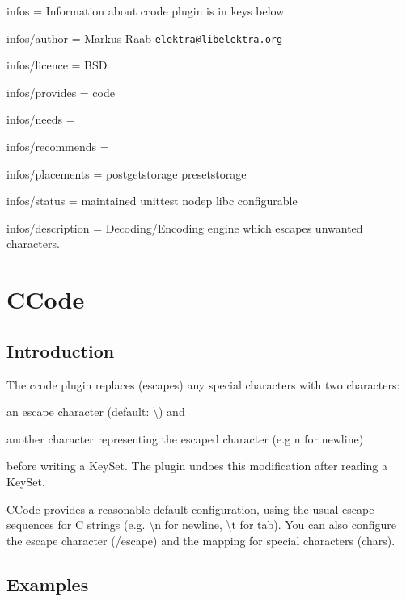 
\begin{DoxyItemize}
\item infos = Information about ccode plugin is in keys below
\item infos/author = Markus Raab \href{mailto:elektra@libelektra.org}{\tt elektra@libelektra.\+org}
\item infos/licence = B\+SD
\item infos/provides = code
\item infos/needs =
\item infos/recommends =
\item infos/placements = postgetstorage presetstorage
\item infos/status = maintained unittest nodep libc configurable
\item infos/description = Decoding/\+Encoding engine which escapes unwanted characters.
\end{DoxyItemize}\hypertarget{md_src_plugins_ccode_README_src_plugins_ccode_README_md}{}\section{C\+Code}\label{md_src_plugins_ccode_README_src_plugins_ccode_README_md}
\subsection*{Introduction}

The {\ttfamily ccode} plugin replaces (escapes) any special characters with two characters\+:


\begin{DoxyItemize}
\item an escape character (default\+: {\ttfamily \textbackslash{}}) and
\item another character representing the escaped character (e.\+g {\ttfamily n} for newline)
\end{DoxyItemize}

before writing a {\ttfamily Key\+Set}. The plugin undoes this modification after reading a {\ttfamily Key\+Set}.

C\+Code provides a reasonable default configuration, using the usual escape sequences for C strings (e.\+g. {\ttfamily \textbackslash{}n} for newline, {\ttfamily \textbackslash{}t} for tab). You can also configure the escape character ({\ttfamily /escape}) and the mapping for special characters ({\ttfamily chars}).

\subsection*{Examples}

